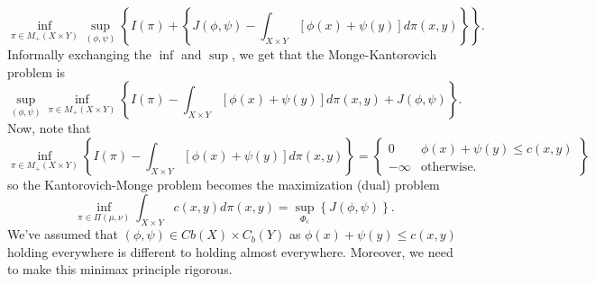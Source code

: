 \documentclass[12pt]{article}
\theoremstyle{plain}
\numberwithin{equation}{section}
\begin{document}
\begin{equation}
  \inf_{\pi\in M_+(X\times Y)}\sup_{(\phi,\psi)}\left\{I(\pi)+\left\{J(\phi,\psi)- \int_{X\times Y} [\phi(x)+\psi(y)]d\pi(x,y)\right\}\right\}.
\end{equation}
Informally exchanging the $\inf$ and $\sup$, we get that the Monge-Kantorovich problem is 
\begin{equation}\label{eqn:swap}
  \sup_{(\phi,\psi)}\inf_{\pi\in M_+(X\times Y)}\left\{I(\pi) - \int_{X\times Y}[\phi(x) +\psi(y)]d\pi(x,y)+J(\phi,\psi)\right\}.
\end{equation}
Now, note that 
\[ \inf_{\pi\in M_+(X\times Y)}\left\{I(\pi) - \int_{X\times Y}[\phi(x) + \psi(y)]d\pi(x,y)\right\} = \left\{\begin{matrix}0 &\phi(x) + \psi(y) \le c(x,y) \\ -\infty &\text{otherwise.}\end{matrix}\right\}\]
so the Kantorovich-Monge problem becomes the maximization (dual) problem
\begin{equation}
  \inf_{\pi\in\Pi(\mu,\nu)}\int_{X\times Y}c(x,y)d\pi(x,y) = \sup_{\Phi_c}\left\{J(\phi,\psi)\right\}.
\end{equation}
We've assumed that $(\phi,\psi) \in Cb(X)\times C_b(Y)$ as $\phi(x)+\psi(y) \le c(x,y)$ holding everywhere is different to holding almost everywhere. Moreover, we need to make this minimax principle rigorous.
\end{document}

